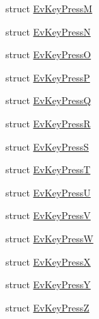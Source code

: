 \begin{DoxyCompactItemize}
\item 
struct \hyperlink{structsm__three__some_1_1cl__keyboard_1_1EvKeyPressM}{Ev\+Key\+PressM}
\item 
struct \hyperlink{structsm__three__some_1_1cl__keyboard_1_1EvKeyPressN}{Ev\+Key\+PressN}
\item 
struct \hyperlink{structsm__three__some_1_1cl__keyboard_1_1EvKeyPressO}{Ev\+Key\+PressO}
\item 
struct \hyperlink{structsm__three__some_1_1cl__keyboard_1_1EvKeyPressP}{Ev\+Key\+PressP}
\item 
struct \hyperlink{structsm__three__some_1_1cl__keyboard_1_1EvKeyPressQ}{Ev\+Key\+PressQ}
\item 
struct \hyperlink{structsm__three__some_1_1cl__keyboard_1_1EvKeyPressR}{Ev\+Key\+PressR}
\item 
struct \hyperlink{structsm__three__some_1_1cl__keyboard_1_1EvKeyPressS}{Ev\+Key\+PressS}
\item 
struct \hyperlink{structsm__three__some_1_1cl__keyboard_1_1EvKeyPressT}{Ev\+Key\+PressT}
\item 
struct \hyperlink{structsm__three__some_1_1cl__keyboard_1_1EvKeyPressU}{Ev\+Key\+PressU}
\item 
struct \hyperlink{structsm__three__some_1_1cl__keyboard_1_1EvKeyPressV}{Ev\+Key\+PressV}
\item 
struct \hyperlink{structsm__three__some_1_1cl__keyboard_1_1EvKeyPressW}{Ev\+Key\+PressW}
\item 
struct \hyperlink{structsm__three__some_1_1cl__keyboard_1_1EvKeyPressX}{Ev\+Key\+PressX}
\item 
struct \hyperlink{structsm__three__some_1_1cl__keyboard_1_1EvKeyPressY}{Ev\+Key\+PressY}
\item 
struct \hyperlink{structsm__three__some_1_1cl__keyboard_1_1EvKeyPressZ}{Ev\+Key\+PressZ}
\end{DoxyCompactItemize}
